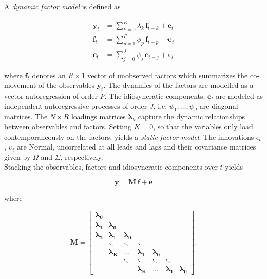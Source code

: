 \documentclass[notitlepage,a4paper,12pt]{article}
\begin{document}
A \textit{dynamic factor model} is defined as

\begin{subequations}
    \label{eqn:factormodel}
    \begin{align}
        \mathbf{y}_t &= \sum_{k=0}^K \lambda_k \, \mathbf{f}_{t-k} + \mathbf{e}_t \label{eqn:facmod_obs}\\ 
        \mathbf{f}_t &= \sum_{p=1}^P \phi_p \, \mathbf{f}_{t-p} + \boldsymbol{\upsilon}_t \label{eqn:facmod_factors}\\
        \mathbf{e}_t &= \sum_{j=0}^J \psi_j \, \mathbf{e}_{t-j} + \boldsymbol{\epsilon}_t \label{eqn:facmod_idios}
    \end{align}
\end{subequations}

where $\mathbf{f}_t$ denotes an $R \times 1$ vector of unobserved factors which summarizes the co-movement of the observables $\mathbf{y}_t$. The dynamics of the factors are modelled as a vector autoregression of order $P$. The idiosyncratic components, $\mathbf{e}_t$ are modeled as independent autoregressive processes of order $J$, i.e. $\psi_1, \dots, \psi_J$ are diagonal matrices. The $N \times R$ loadings matrices $\mathbf{\lambda}_k$ capture the dynamic relationships between observables and factors. Setting $K=0$, so that the variables only load contemporaneously on the factors, yields a \textit{static factor model}. The innovations $\epsilon_t$, $\upsilon_t$ are Normal, uncorrelated at all leads and lags and their covariance matrices given by $\Omega$ and $\Sigma$, respectively. \\

Stacking the observables, factors and idiosyncratic components over $t$ yields 

\begin{equation}
    \mathbf{y} = \mathbf{M} \, \mathbf{f} + \mathbf{e}
\end{equation} 

\noindent where 

$$
\mathbf{M}
=
\begin{bmatrix}
    \boldsymbol{\lambda_0} &   \\
    \boldsymbol{\lambda_1} & \boldsymbol{\lambda_0}   \\
    \boldsymbol{\lambda_2} & \boldsymbol{\lambda_1} & \boldsymbol{\lambda_0} \\
     & \ddots & \ddots & \ddots \\
     & \boldsymbol{\lambda_K} &\dots & \boldsymbol{\lambda_1} & \boldsymbol{\lambda_0}
     &  \\
     & & \ddots & \ddots & \ddots & \ddots \\
    & & & \boldsymbol{\lambda_K} &\dots & \boldsymbol{\lambda_1} & \boldsymbol{\lambda_0}
\end{bmatrix}.
$$
\end{document}
